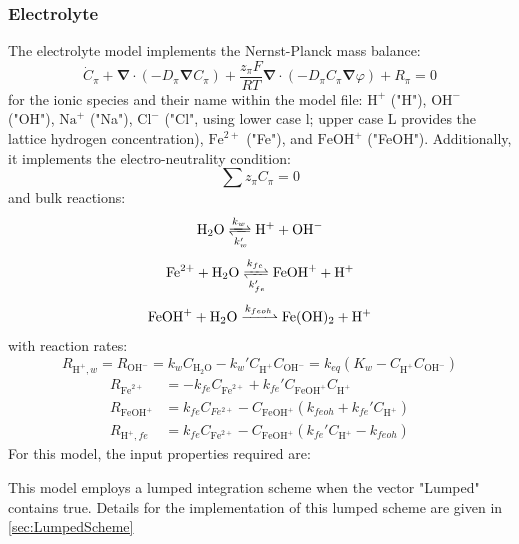 \documentclass[3p]{elsarticle} %
\begin{document}
\subsubsection{Electrolyte}
The electrolyte model implements the Nernst-Planck mass balance:
\begin{equation}
    \dot{C}_{\pi}+\bm{\nabla}\cdot\left(-D_\pi \bm{\nabla}C_\pi\right) + \frac{z_\pi F}{RT} \bm{\nabla} \cdot \left(-D_\pi C_\pi \bm{\nabla} \varphi\right) +R_\pi = 0 
\end{equation}
for the ionic species and their name within the model file: $\mathrm{H}^+$ ("H"), $\mathrm{OH}^-$ ("OH"), $\mathrm{Na}^+$ ("Na"), $\mathrm{Cl}^-$ ("Cl", using lower case l; upper case L provides the lattice hydrogen concentration), $\mathrm{Fe}^{2+}$ ("Fe"), and $\mathrm{FeOH}^{+}$ ("FeOH"). Additionally, it implements the electro-neutrality condition:
\begin{equation}
	\sum z_\pi C_\pi = 0
\end{equation}
and bulk reactions:
\begin{equation}
    \mathrm{H}_2\mathrm{O} \xrightleftharpoons[k_{w}']{k_{w}} \mathrm{H}^+ + \mathrm{OH}^- \label{react:water}
\end{equation}
\begin{equation}
    \mathrm{Fe}^{2+} + \mathrm{H}_2\mathrm{O} \xrightleftharpoons[k_{fe}']{k_{fe}} \mathrm{FeOH}^+ + \mathrm{H}^+ \label{react:fe_feoh}
\end{equation}
\begin{equation}
    \mathrm{FeOH}^{+} + \mathrm{H}_2\mathrm{O} \xrightharpoonup{k_{feoh}} \mathrm{Fe}(\mathrm{OH})_2 + \mathrm{H}^+ \label{react:feoh_feoh2}
\end{equation}
with reaction rates:
\begin{equation}
    R_{\mathrm{H}^+,w}=R_{\mathrm{OH}^-} = k_{w}C_{\mathrm{H}_2\mathrm{O}} - k_{w}'C_{\mathrm{H}^+}C_{\mathrm{OH}^-}  = k_{eq} \left(K_w-C_{\mathrm{H}^+} C_{\mathrm{OH}^-} \right) \label{eq:water_react}
\end{equation}
\begin{align}
    R_{\mathrm{Fe}^{2+}}&=-k_{fe}C_{\mathrm{Fe}^{2+}}+k_{fe}'C_{\mathrm{FeOH}^+}C_{\mathrm{H}^+} \\
    R_{\mathrm{FeOH}^+}&=k_{fe}C_{Fe^{2+}}-C_{\mathrm{FeOH}^+}(k_{feoh}+k_{fe}'C_{\mathrm{H}^+})\\
    R_{\mathrm{H}^+,fe}&=k_{fe}C_{\mathrm{Fe}^{2+}}-C_{\mathrm{FeOH}^+}(k_{fe}'C_{\mathrm{H}^+}-k_{feoh}) \label{eq:H_Part2}
\end{align}
For this model, the input properties required are:

This model employs a lumped integration scheme when the vector "Lumped" contains true. Details for the implementation of this lumped scheme are given in \cref{sec:LumpedScheme}
\end{document}
